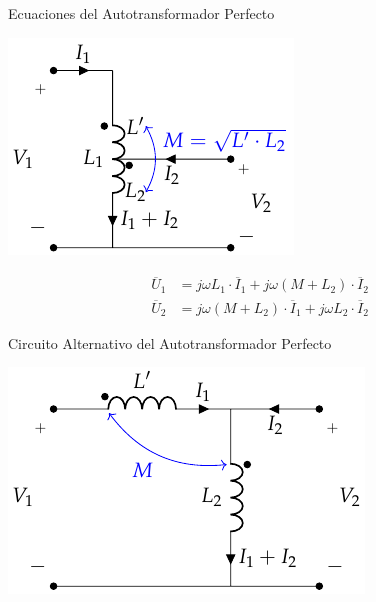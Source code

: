 \documentclass[xcolor={usenames,svgnames,dvipsnames}]{beamer}
\begin{document}
\begin{frame}[label={sec:org8a09574}]{Ecuaciones del Autotransformador Perfecto}
\begin{center}
\includegraphics[height=0.5\textheight]{../figs/AutotrafoPerfecto.pdf}
\end{center}

\begin{align*}
  \overline{U}_1 &= j \omega L_1 \cdot \overline{I}_1 + j \omega (M + L_2) \cdot \overline{I}_2\\
  \overline{U}_2 &= j \omega (M + L_2) \cdot \overline{I}_1 + j \omega L_2 \cdot \overline{I}_2
\end{align*}
\end{frame}
\begin{frame}[label={sec:org353c37d}]{Circuito Alternativo del Autotransformador Perfecto}
\begin{center}
\includegraphics[width=.9\linewidth]{../figs/AutotrafoPerfecto2.pdf}
\end{center}
\end{frame}
\end{document}
